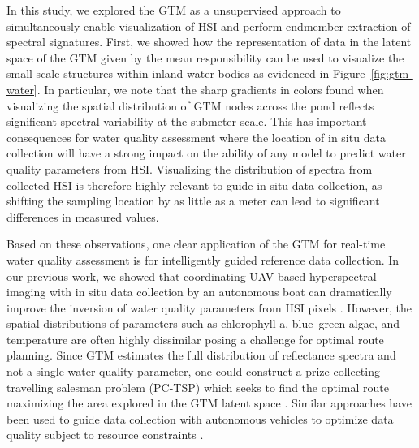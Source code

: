 In this study, we explored the GTM as a unsupervised approach to simultaneously
enable visualization of HSI and perform endmember extraction of spectral
signatures. First, we showed how the representation of data in the latent space
of the GTM given by the mean responsibility can be used to visualize the
small-scale structures within inland water bodies as evidenced in
Figure~\ref{fig:gtm-water}. In particular, we note that the sharp gradients in
colors found when visualizing the spatial distribution of GTM nodes across the
pond reflects significant spectral variability at the submeter scale.
This has important consequences for water quality assessment where the location
of in situ data collection will have a strong impact on the ability of any model
to predict water quality parameters from HSI. Visualizing the distribution of
spectra from collected HSI is therefore highly relevant to guide in situ data
collection, as shifting the sampling location by as little as a meter can lead
to significant differences in measured values.

Based on these observations, one clear application of the GTM for real-time
water quality assessment is for intelligently guided reference data collection.
In our previous work, we showed that coordinating UAV-based hyperspectral
imaging with in situ data collection by an autonomous boat can dramatically
improve the inversion of water quality parameters from HSI pixels
\cite{robot-team-2}. However, the spatial distributions of parameters such as
chlorophyll-a, blue--green algae, and temperature are often highly dissimilar
posing a challenge for optimal route planning. Since  GTM estimates the full
distribution of reflectance spectra and not a single water quality parameter,
one could construct a prize collecting travelling salesman problem (PC-TSP)
which seeks to find the optimal route maximizing the area explored in the GTM
latent space \cite{balas2007prize}. Similar approaches have been used to guide
data collection with autonomous vehicles to optimize data quality subject to
resource constraints \cite{suryan2020learning}.

